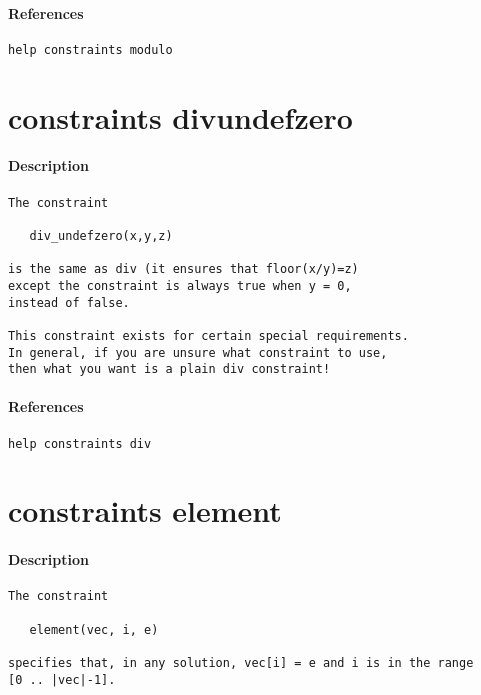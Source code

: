 \paragraph{References}
{\footnotesize
\begin{verbatim}
help constraints modulo
\end{verbatim}
}
\section{constraints div\textunderscore undefzero}
\paragraph{Description}
{\footnotesize
\begin{verbatim}
The constraint
 
   div_undefzero(x,y,z)

is the same as div (it ensures that floor(x/y)=z)
except the constraint is always true when y = 0,
instead of false.

This constraint exists for certain special requirements.
In general, if you are unsure what constraint to use,
then what you want is a plain div constraint!
\end{verbatim}
}
\paragraph{References}
{\footnotesize
\begin{verbatim}
help constraints div
\end{verbatim}
}
\section{constraints element}
\paragraph{Description}
{\footnotesize
\begin{verbatim}
The constraint 

   element(vec, i, e)

specifies that, in any solution, vec[i] = e and i is in the range 
[0 .. |vec|-1].
\end{verbatim}
}
